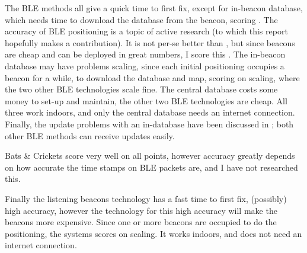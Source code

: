 The BLE methods all give a quick time to first fix, except for in-beacon database, which needs time to download the database from the beacon, scoring \maybe.
The accuracy of BLE positioning is a topic of active research (to which this report hopefully makes a contribution).
It is not per-se better than \wifi, but since beacons are cheap and can be deployed in great numbers, I score this \maybe.
The in-beacon database may have problems scaling, since each initial positioning occupies a beacon for a while, to download the database and map, scoring \maybe on scaling, where the two other BLE technologies scale fine.
The central database costs some money to set-up and maintain, the other two BLE technologies are cheap.
All three work indoors, and only the central database needs an internet connection.
Finally, the update problems with an in-\app database have been discussed in ; both other BLE methods can receive updates easily.

Bats \& Crickets score very well on all points, however accuracy greatly depends on how accurate the time stamps on BLE packets are, and I have not researched this.

Finally the listening beacons technology has a fast time to first fix, (possibly) high accuracy, however the technology for this high accuracy will make the beacons more expensive.
Since one or more beacons are occupied to do the positioning, the systems scores \maybe on scaling.
It works indoors, and does not need an internet connection.

